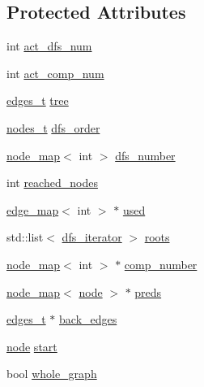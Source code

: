 \subsection*{Protected Attributes}
\begin{DoxyCompactItemize}
\item 
int \mbox{\hyperlink{classdfs_aedaf2b485ff83150b1de6c305922473b}{act\+\_\+dfs\+\_\+num}}
\item 
int \mbox{\hyperlink{classdfs_ab0251ac30adfd569e214a64db7f3a905}{act\+\_\+comp\+\_\+num}}
\item 
\mbox{\hyperlink{edge_8h_a8f9587479bda6cf612c103494b3858e3}{edges\+\_\+t}} \mbox{\hyperlink{classdfs_aed496b618a937723bfec0b463e17e8d5}{tree}}
\item 
\mbox{\hyperlink{edge_8h_a22ac17689106ba21a84e7bc54d1199d6}{nodes\+\_\+t}} \mbox{\hyperlink{classdfs_af70a73ace68afd91ef944f984c9f28d5}{dfs\+\_\+order}}
\item 
\mbox{\hyperlink{classnode__map}{node\+\_\+map}}$<$ int $>$ \mbox{\hyperlink{classdfs_a99727f2274d6af63daae4f0518f3adbe}{dfs\+\_\+number}}
\item 
int \mbox{\hyperlink{classdfs_acb11186a1a2a2a1f38cdc0674340ba37}{reached\+\_\+nodes}}
\item 
\mbox{\hyperlink{classedge__map}{edge\+\_\+map}}$<$ int $>$ $\ast$ \mbox{\hyperlink{classdfs_afc18288747491be301d6d8d85d8f220b}{used}}
\item 
std\+::list$<$ \mbox{\hyperlink{classdfs_a15fe023a5a1f7ddda00f3d87110d9a32}{dfs\+\_\+iterator}} $>$ \mbox{\hyperlink{classdfs_a0bbd5cb8df26c891b74dadd84b46a06b}{roots}}
\item 
\mbox{\hyperlink{classnode__map}{node\+\_\+map}}$<$ int $>$ $\ast$ \mbox{\hyperlink{classdfs_a00db016ac7eab69045cae408008890c1}{comp\+\_\+number}}
\item 
\mbox{\hyperlink{classnode__map}{node\+\_\+map}}$<$ \mbox{\hyperlink{classnode}{node}} $>$ $\ast$ \mbox{\hyperlink{classdfs_a3fdeb5a211a1bc1753b2a637258c5355}{preds}}
\item 
\mbox{\hyperlink{edge_8h_a8f9587479bda6cf612c103494b3858e3}{edges\+\_\+t}} $\ast$ \mbox{\hyperlink{classdfs_a1dc18a7df8d6b238d5301c92fc7540fa}{back\+\_\+edges}}
\item 
\mbox{\hyperlink{classnode}{node}} \mbox{\hyperlink{classdfs_af677cfc31fe06a18dd3a3aae7f7d112b}{start}}
\item 
bool \mbox{\hyperlink{classdfs_ab8342c80ab208ef0e0d781f0769d0d95}{whole\+\_\+graph}}
\end{DoxyCompactItemize}
